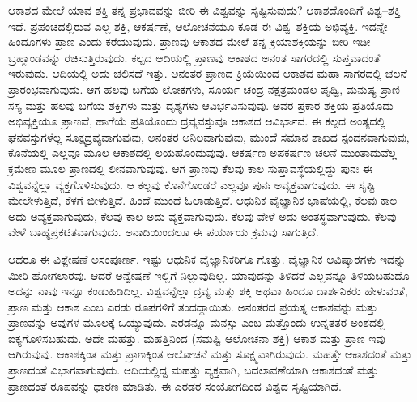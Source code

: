 \vskip 0.2cm

ಆಕಾಶದ ಮೇಲೆ ಯಾವ ಶಕ್ತಿ ತನ್ನ ಪ್ರಭಾವವನ್ನು ಬೀರಿ ಈ ವಿಶ್ವವನ್ನು ಸೃಷ್ಟಿಸುವುದು? ಆಕಾಶದೊಂದಿಗೆ ವಿಶ್ವ–ಶಕ್ತಿ ಇದೆ. ಪ್ರಪಂಚದಲ್ಲಿರುವ ಎಲ್ಲ ಶಕ್ತಿ, ಆಕರ್ಷಣೆ, ಆಲೋಚನೆಯೂ ಕೂಡ ಈ ವಿಶ್ವ–ಶಕ್ತಿಯ ಅಭಿವ್ಯಕ್ತಿ. ಇದನ್ನೇ ಹಿಂದೂಗಳು ಪ್ರಾಣ ಎಂದು ಕರೆಯುವುದು. ಪ್ರಾಣವು ಆಕಾಶದ ಮೇಲೆ ತನ್ನ ಕ್ರಿಯಾಶಕ್ತಿಯನ್ನು ಬೀರಿ ಇಡೀ ಬ್ರಹ್ಮಾಂಡವನ್ನು ರಚಿಸುತ್ತಿರುವುದು. ಕಲ್ಪದ ಆದಿಯಲ್ಲಿ ಪ್ರಾಣವು ಆಕಾಶದ ಅನಂತ ಸಾಗರದಲ್ಲಿ ಸುಪ್ತವಾದಂತೆ ಇರುವುದು. ಆದಿಯಲ್ಲಿ ಅದು ಚಲಿಸದೆ ಇತ್ತು. ಅನಂತರ ಪ್ರಾಣದ ಕ್ರಿಯೆಯಿಂದ ಆಕಾಶದ ಮಹಾ ಸಾಗರದಲ್ಲಿ ಚಲನೆ ಪ್ರಾರಂಭವಾಗುವುದು. ಆಗ ಹಲವು ಬಗೆಯ ಲೋಕಗಳು, ಸೂರ್ಯ ಚಂದ್ರ ನಕ್ಷತ್ರಮಂಡಲ ಪೃಥ್ವಿ, ಮನುಷ್ಯ ಪ್ರಾಣಿ ಸಸ್ಯ ಮತ್ತು ಹಲವು ಬಗೆಯ ಶಕ್ತಿಗಳು ಮತ್ತು ದೃಶ್ಯಗಳು ಆವಿರ್ಭವಿಸುವುವು. ಅವರ ಪ್ರಕಾರ ಶಕ್ತಿಯ ಪ್ರತಿಯೊದು ಅಭಿವ್ಯಕ್ತಿಯೂ ಪ್ರಾಣವೆ, ಹಾಗೆಯೆ ಪ್ರತಿಯೊಂದು ದ್ರವ್ಯವಸ್ತುವೂ ಆಕಾಶದ ಆವಿರ್ಭಾವ. ಈ ಕಲ್ಪದ ಅಂತ್ಯದಲ್ಲಿ ಘನವಸ್ತುಗಳೆಲ್ಲ ಸೂಕ್ಷ್ಮದ್ರವ್ಯವಾಗುವುವು, ಅನಂತರ ಅನಿಲವಾಗುವುವು, ಮುಂದೆ ಸಮಾನ ಶಾಖದ ಸ್ಪಂದನವಾಗುವುವು, ಕೊನೆಯಲ್ಲಿ ಎಲ್ಲವೂ ಮೂಲ ಆಕಾಶದಲ್ಲಿ ಲಯಹೊಂದುವುವು. ಆಕರ್ಷಣ ಅಪಕರ್ಷಣ ಚಲನೆ ಮುಂತಾದುವೆಲ್ಲ ಕ್ರಮೇಣ ಮೂಲ ಪ್ರಾಣದಲ್ಲಿ ಲೀನವಾಗುವುವು. ಆಗ ಪ್ರಾಣವು ಕೆಲವು ಕಾಲ ಸುಪ್ತಾವಸ್ಥೆಯಲ್ಲಿದ್ದು ಪುನಃ ಈ ವಿಶ್ವವನ್ನೆಲ್ಲಾ ವ್ಯಕ್ತಗೊಳಿಸುವುದು. ಆ ಕಲ್ಪವು ಕೊನೆಗೊಂಡರೆ ಎಲ್ಲವೂ ಪುನಃ ಅವ್ಯಕ್ತವಾಗುವುದು. ಈ ಸೃಷ್ಟಿ ಮೇಲೇಳುತ್ತಿದೆ, ಕೆಳಗೆ ಬೀಳುತ್ತಿದೆ. ಹಿಂದೆ ಮುಂದೆ ಓಲಾಡುತ್ತಿದೆ. ಆಧುನಿಕ ವೈಜ್ಞಾನಿಕ ಭಾಷೆಯಲ್ಲಿ, ಕೆಲವು ಕಾಲ ಅದು ಅವ್ಯಕ್ತವಾಗುವುದು, ಕೆಲವು ಕಾಲ ಅದು ವ್ಯಕ್ತವಾಗುವುದು. ಕೆಲವು ವೇಳೆ ಅದು ಅಂತಸ್ಥವಾಗುವುದು. ಕೆಲವು ವೇಳೆ ಬಾಹ್ಯಪ್ರಕಟಿತವಾಗುವುದು. ಅನಾದಿಯಿಂದಲೂ ಈ ಪರ್ಯಾಯ ಕ್ರಮವು ಸಾಗುತ್ತಿದೆ.

\vskip 0.2cm

ಆದರೂ ಈ ವಿಶ್ಲೇಷಣೆ ಅಸಂಪೂರ್ಣ. ಇಷ್ಟು ಆಧುನಿಕ ವೈಜ್ಞಾನಿಕರಿಗೂ ಗೊತ್ತು. ವೈಜ್ಞಾನಿಕ ಆವಿಷ್ಕಾರಗಳು ಇದನ್ನು ಮೀರಿ ಹೋಗಲಾರವು. ಆದರೆ ಅನ್ವೇಷಣೆ ಇಲ್ಲಿಗೆ ನಿಲ್ಲುವುದಿಲ್ಲ. ಯಾವುದನ್ನು ತಿಳಿದರೆ ಎಲ್ಲವನ್ನೂ ತಿಳಿಯಬಹುದೊ ಅದನ್ನು ನಾವು ಇನ್ನೂ ಕಂಡುಹಿಡಿದಿಲ್ಲ. ವಿಶ್ವವನ್ನೆಲ್ಲಾ ದ್ರವ್ಯ ಮತ್ತು ಶಕ್ತಿ ಅಥವಾ ಹಿಂದೂ ದಾರ್ಶನಿಕರು ಹೇಳುವಂತೆ, ಪ್ರಾಣ ಮತ್ತು ಆಕಾಶ ಎಂಬ ಎರಡು ರೂಪಗಳಿಗೆ ತಂದದ್ದಾಯಿತು. ಅನಂತರದ ಪ್ರಯತ್ನ ಆಕಾಶವನ್ನು ಮತ್ತು ಪ್ರಾಣವನ್ನು ಅವುಗಳ ಮೂಲಕ್ಕೆ ಒಯ್ಯುವುದು. ಎರಡನ್ನೂ ಮನಸ್ಸು ಎಂಬ ಮತ್ತೊಂದು ಉನ್ನತತರ ಅಂಶದಲ್ಲಿ ಐಕ್ಯಗೊಳಿಸಬಹುದು. ಅದೇ ಮಹತ್ತು. ಮಹತ್ತಿನಿಂದ (ಸಮಷ್ಟಿ ಆಲೋಚನಾ ಶಕ್ತಿ) ಆಕಾಶ ಮತ್ತು ಪ್ರಾಣ ಇವು ಆಗಿರುವುವು. ಆಕಾಶಕ್ಕಿಂತ ಮತ್ತು ಪ್ರಾಣಕ್ಕಿಂತ ಆಲೋಚನೆ ಮತ್ತು ಸೂಕ್ಷ್ಮವಾಗಿರುವುದು. ಮಹತ್ತೇ ಆಕಾಶದಂತೆ ಮತ್ತು ಪ್ರಾಣದಂತೆ ವಿಭಾಗವಾಗುವುದು. ಆದಿಯಲ್ಲಿದ್ದ ಮಹತ್ತು ವ್ಯಕ್ತವಾಗಿ, ಬದಲಾವಣೆಯಾಗಿ ಆಕಾಶದಂತೆ ಮತ್ತು ಪ್ರಾಣದಂತೆ ರೂಪವನ್ನು ಧಾರಣ ಮಾಡಿತು. ಈ ಎರಡರ ಸಂಯೋಗದಿಂದ ವಿಶ್ವದ ಸೃಷ್ಟಿಯಾಗಿದೆ.

\vskip 0.2cm

